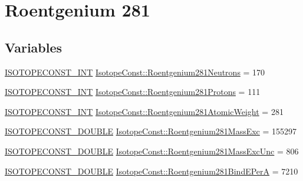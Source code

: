\hypertarget{group___isotope_const-_roentgenium-_rg281}{}\section{Roentgenium 281}
\label{group___isotope_const-_roentgenium-_rg281}
\subsection*{Variables}
\begin{DoxyCompactItemize}
\item 
\mbox{\hyperlink{group___isotope_const-_macros_ga5f18360b3e99483a35c32d789e62621c}{I\+S\+O\+T\+O\+P\+E\+C\+O\+N\+S\+T\+\_\+\+I\+NT}} \mbox{\hyperlink{group___isotope_const-_roentgenium-_rg281_ga6b322bdc014d81989501512625663e86}{Isotope\+Const\+::\+Roentgenium281\+Neutrons}} = 170
\item 
\mbox{\hyperlink{group___isotope_const-_macros_ga5f18360b3e99483a35c32d789e62621c}{I\+S\+O\+T\+O\+P\+E\+C\+O\+N\+S\+T\+\_\+\+I\+NT}} \mbox{\hyperlink{group___isotope_const-_roentgenium-_rg281_ga12a3bd3e28bcadad8184509ee4373008}{Isotope\+Const\+::\+Roentgenium281\+Protons}} = 111
\item 
\mbox{\hyperlink{group___isotope_const-_macros_ga5f18360b3e99483a35c32d789e62621c}{I\+S\+O\+T\+O\+P\+E\+C\+O\+N\+S\+T\+\_\+\+I\+NT}} \mbox{\hyperlink{group___isotope_const-_roentgenium-_rg281_ga1887699a14b039d3d997f0edcaa4d9c8}{Isotope\+Const\+::\+Roentgenium281\+Atomic\+Weight}} = 281
\item 
\mbox{\hyperlink{group___isotope_const-_macros_ga8f45a7272ce02c0b4c65c44636ed719a}{I\+S\+O\+T\+O\+P\+E\+C\+O\+N\+S\+T\+\_\+\+D\+O\+U\+B\+LE}} \mbox{\hyperlink{group___isotope_const-_roentgenium-_rg281_ga021ad48ba3f9a9b7bfa0f8512f98144b}{Isotope\+Const\+::\+Roentgenium281\+Mass\+Exc}} = 155297
\item 
\mbox{\hyperlink{group___isotope_const-_macros_ga8f45a7272ce02c0b4c65c44636ed719a}{I\+S\+O\+T\+O\+P\+E\+C\+O\+N\+S\+T\+\_\+\+D\+O\+U\+B\+LE}} \mbox{\hyperlink{group___isotope_const-_roentgenium-_rg281_ga7e744cd36a11f6fdd2802c50e5b8ee4c}{Isotope\+Const\+::\+Roentgenium281\+Mass\+Exc\+Unc}} = 806
\item 
\mbox{\hyperlink{group___isotope_const-_macros_ga8f45a7272ce02c0b4c65c44636ed719a}{I\+S\+O\+T\+O\+P\+E\+C\+O\+N\+S\+T\+\_\+\+D\+O\+U\+B\+LE}} \mbox{\hyperlink{group___isotope_const-_roentgenium-_rg281_ga0ed16dcd5058d100b16c8d5f82c85d8e}{Isotope\+Const\+::\+Roentgenium281\+Bind\+E\+PerA}} = 7210

\end{DoxyCompactItemize}
